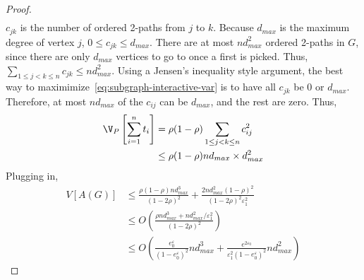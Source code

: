 \begin{proof}
\begin{align}
  \end{align}
  $c_{jk}$ is the number of ordered 2-paths from $j$ to $k$. Because $d_{max}$ is the maximum
  degree of vertex $j$, $0 \leq c_{jk} \leq d_{max}$. There are at most
  $nd_{max}^2$ ordered
  2-paths in $G$, since there are only $d_{max}$ vertices to go to once a first is
  picked. Thus, $\sum_{1 \leq j < k \leq n} c_{jk} \leq nd_{max}^2$. Using a Jensen's inequality
  style argument, the best way to maximimize~\eqref{eq:subgraph-interactive-var} is to have
  all $c_{jk}$ be $0$ or $d_{max}$. Therefore, at most $nd_{max}$ of the $c_{ij}$
  can be $d_{max}$, and the rest are zero. Thus,
  \begin{align*}
    \V_P\left[\sum_{i=1}^n t_i \right] &=
    \rho(1-\rho) \sum_{1 \leq j < k \leq n} c_{ij}^2 \\ &\leq \rho(1-\rho)
    nd_{max} \times
    d_{max}^2
  \end{align*}
  Plugging in,
  \begin{align*}
    V[A(G)] &\leq \frac{\rho(1-\rho)nd_{max}^3}{(1-2\rho)^2} +
    \frac{2nd_{max}^2(1-\rho)^2}{(1-2\rho)^2\varepsilon_1^2} \\
    &\leq O\left(\frac{\rho nd_{max}^3 + nd_{max}^2/\varepsilon_1^2}{(1-2\rho)^2} \right) \\
    &\leq O\left(\frac{e^\varepsilon_0}{(1-e^\varepsilon_0)^2} nd_{max}^3 +
    \frac{e^{2\varepsilon_0}}{\varepsilon_1^2(1-e^\varepsilon_0)^2} nd_{max}^2\right)
  \end{align*}
\end{proof}


